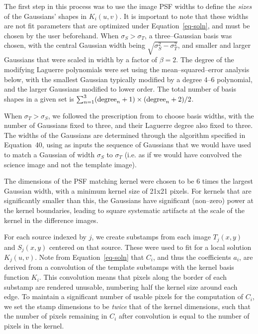 \documentclass[iop]{emulateapj}
\begin{document}
The first step in this process was to use the image PSF widths to define the {\it sizes} of the Gaussians' shapes in $K_i(u,v)$.
It is important to note that these widths are not fit parameters that are optimized under Equation~\ref{eq-soln}, and must be chosen by the user beforehand.
When $\sigma_S > \sigma_T$, a three--Gaussian basis was chosen, with the central Gaussian width being $\sqrt{\sigma_S^2 - \sigma_T^2}$, and smaller and larger Gaussians that were scaled in width by a factor of $\beta = 2$.
The degree of the modifying Laguerre polynomials were set using the mean--squared--error analysis below, with the smallest Gaussian typically modified by a degree 4--6 polynomial, and the larger Gaussians modified to lower order.
The total number of basis shapes in a given set is $\sum_{n=1}^{3} ({\rm degree}_n+1)\times({\rm degree}_n+2)/2$.

When $\sigma_T > \sigma_S$, we followed the prescription from \cite{0266-5611-26-8-085002} to choose basis widths, with the number of Gaussians fixed to three, and their Laguerre degree also fixed to three.
The widths of the Gaussians are determined through the algorithm specified in \cite{0266-5611-26-8-085002} Equation~40, using as inputs the sequence of Gaussians that we would have used to match a Gaussian of width $\sigma_S$ to $\sigma_T$ (i.e. as if we would have convolved the science image and not the template image).

The dimensions of the PSF matching kernel were chosen to be 6 times the largest Gaussian width, with a minimum kernel size of 21x21 pixels.
For kernels that are significantly smaller than this, the Gaussians have significant (non--zero) power at the kernel boundaries, leading to square systematic artifacts at the scale of the kernel in the difference images.

For each source indexed by $j$, we create substamps from each image $T_j(x,y)$ and $S_j(x,y)$ centered on that source.
These were used to fit for a local solution $K_j(u,v)$.
Note from Equation~\ref{eq-soln} that $C_i$, and thus the coefficients $a_i$, are derived from a convolution of the template substamps with the kernel basis function $K_i$.
This convolution means that pixels along the border of each substamp are rendered unusable, numbering half the kernel size around each edge.
To maintain a significant number of usable pixels for the computation of $C_i$, we set the stamp dimensions to be {\it twice} that of the kernel dimensions, such that the number of pixels remaining in $C_i$ after convolution is equal to the number of pixels in the kernel.
\end{document}

